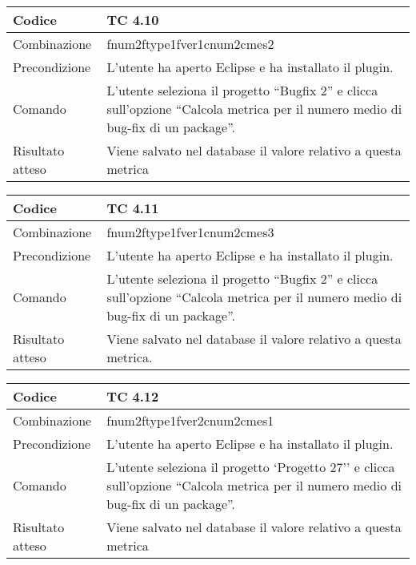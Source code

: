 \begin{table}[ht]
\begin{tabular}{|p{3cm}|p{9cm}|}
\hline
\cellcolor{lightgray}Codice				& TC 4.10								\\
\hline
\cellcolor{lightgray}Combinazione		& fnum2ftype1fver1cnum2cmes2 									\\
\hline
\cellcolor{lightgray}Precondizione		& L'utente ha aperto Eclipse e ha installato il plugin.									\\
\hline
\cellcolor{lightgray}Comando			& L'utente seleziona il progetto ``Bugfix 2''  e clicca sull'opzione ``Calcola metrica per il numero medio di bug-fix di un package''.	\\
\hline
\cellcolor{lightgray}Risultato atteso	& Viene salvato nel database il valore relativo a questa metrica	\\
\hline
\end{tabular}
\end{table}
\clearpage

\begin{table}[ht]
\begin{tabular}{|p{3cm}|p{9cm}|}
\hline
\cellcolor{lightgray}Codice				& TC 4.11								\\
\hline
\cellcolor{lightgray}Combinazione		& fnum2ftype1fver1cnum2cmes3									\\
\hline
\cellcolor{lightgray}Precondizione		& L'utente ha aperto Eclipse e ha installato il plugin.		\\
\hline
\cellcolor{lightgray}Comando			& L'utente seleziona il progetto ``Bugfix 2''  e clicca sull'opzione ``Calcola metrica per il numero medio di bug-fix di un package''.	\\
\hline
\cellcolor{lightgray}Risultato atteso	& Viene salvato nel database il valore relativo a questa metrica.\\
\hline
\end{tabular}
\end{table}

\begin{table}[ht]
\begin{tabular}{|p{3cm}|p{9cm}|}
\hline
\cellcolor{lightgray}Codice				& TC 4.12								\\
\hline
\cellcolor{lightgray}Combinazione		& fnum2ftype1fver2cnum2cmes1 									\\
\hline
\cellcolor{lightgray}Precondizione		& L'utente ha aperto Eclipse e ha installato il plugin.				\\
\hline
\cellcolor{lightgray}Comando			& L'utente seleziona il progetto `Progetto 27''  e clicca sull'opzione ``Calcola metrica per il numero medio di bug-fix di un package''.	\\
\hline
\cellcolor{lightgray}Risultato atteso	& Viene salvato nel database il valore relativo a questa metrica	\\
\hline
\end{tabular}
\end{table}

